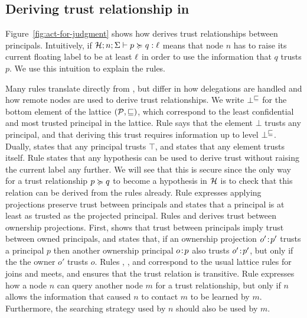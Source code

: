 \subsection{Deriving trust relationship in \lang}\label{subsec:deriving-trust}
Figure~\ref{fig:act-for-judgment} shows how \lang{} derives trust relationships between principals. Intuitively, if $\mathcal{H}; n; \Sigma \vdash p \succcurlyeq q : \ell$ means that node $n$ has to raise its current floating label to be at least $\ell$ in order to use the information that $q$ trusts $p$. We use this intuition to explain the rules.

Many rules translate directly from \cite{Arden:2015:FA:2859845.2859998}, but differ in how delegations are handled and how remote nodes are used to derive trust relationships. We write $\bot^{\sqsubseteq}$ for the bottom element of the lattice $(\mathcal{P}, \sqsubseteq)$, which correspond to the least confidential and most trusted principal in the lattice. Rule  says that the element $\bot$ trusts any principal, and that deriving this trust requires information up to level $\bot^{\sqsubseteq}$. Dually,  states that any principal trusts $\top$, and  states that any element trusts itself. Rule  states that any hypothesis can be used to derive trust without raising the current label any further. We will see that this is secure since the only way for a trust relationship $p \succcurlyeq q$ to become a hypothesis in $\mathcal{H}$ is to check that this relation can be derived from the rules already.  Rule  expresses applying projections preserve trust between principals and  states that a principal is at least as trusted as the projected principal. Rules  and  derives trust between ownership projections. First,  shows that trust between principals imply trust between owned principals, and  states that, if an ownership projection $o'\!:\!p'$ trusts a principal $p$ then another ownership principal $o\!:\!p$ also trusts $o'\!:\!p'$, but only if the the owner $o'$ trusts $o$. Rules , ,  and  correspond to the usual lattice rules for joins and meets, and  ensures that the trust relation is transitive. Rule  expresses how a node $n$ can query another node $m$ for a trust relationship, but only if $n$ allows the information that caused $n$ to contact $m$ to be learned by $m$. Furthermore, the searching strategy used by $n$ should also be used by $m$.

